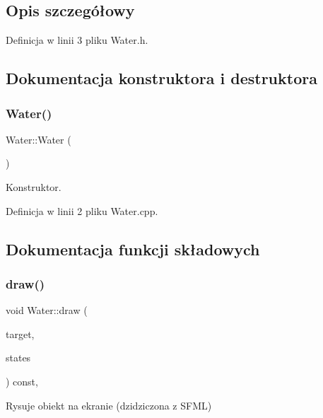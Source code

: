 \subsection{Opis szczegółowy}


Definicja w linii 3 pliku Water.\+h.



\subsection{Dokumentacja konstruktora i destruktora}
\mbox{\label{class_water_a32d8f391b149a405008a606ceafa35ee}} 
\subsubsection{\texorpdfstring{Water()}{Water()}}
{\footnotesize\ttfamily Water\+::\+Water (\begin{DoxyParamCaption}{ }\end{DoxyParamCaption})}



Konstruktor. 



Definicja w linii 2 pliku Water.\+cpp.



\subsection{Dokumentacja funkcji składowych}
\mbox{\label{class_water_a4a929b9c339c55d6c7bcabe79349bae8}} 
\subsubsection{\texorpdfstring{draw()}{draw()}}
{\footnotesize\ttfamily void Water\+::draw (\begin{DoxyParamCaption}\item[{sf\+::\+Render\+Target \&}]{target,  }\item[{sf\+::\+Render\+States}]{states }\end{DoxyParamCaption}) const\hspace{0.3cm}{\ttfamily [override]}, {\ttfamily [protected]}}



Rysuje obiekt na ekranie (dzidziczona z S\+F\+ML) 


